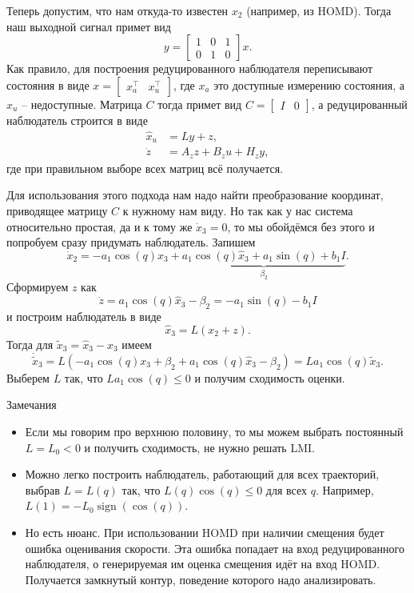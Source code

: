 \documentclass{article}
\newcommand{\sign}{\operatorname{sign}}
\begin{document}
Теперь допустим, что нам откуда-то известен $x_2$ (например, из HOMD). Тогда наш выходной сигнал примет вид
\[
	y = \begin{bmatrix} 1 & 0 & 1 \\ 0 & 1 & 0 \end{bmatrix}x.
\]
Как правило, для построения редуцированного наблюдателя переписывают состояния в виде $x=\begin{bmatrix} x_a^\top & x_u^\top \end{bmatrix}$, где $x_a$ это доступные измерению состояния, а $x_u$ -- недоступные. Матрица $C$ тогда примет вид $C=\begin{bmatrix} I & 0 \end{bmatrix}$, а редуцированный наблюдатель строится в виде
\[
	\begin{aligned}
		\hat{x}_u &= Ly + z, \\
		\dot{z} &= A_z z + B_z u + H_z y,
	\end{aligned}
\]
где при правильном выборе всех матриц всё получается. 

Для использования этого подхода нам надо найти преобразование координат, приводящее матрицу $C$ к нужному нам виду. Но так как у нас система относительно простая, да и к тому же $\dot{x}_3=0$, то мы обойдёмся без этого и попробуем сразу придумать наблюдатель. Запишем
\[
	\dot{x}_2 = -a_1\cos(q)x_3 + \underbrace{a_1\cos(q)\hat{x}_3 + a_1\sin(q) + b_1I}_{\beta_2}.
\]
Сформируем $z$ как
\[
	\dot{z} = a_1\cos(q)\hat{x}_3 - \beta_2 = -a_1\sin(q) - b_1I
\]
и построим наблюдатель в виде
\[
	\hat{x}_3 = L \left(x_2 + z\right).
\]
Тогда для $\tilde{x}_3 = \hat{x}_3 - x_3$ имеем
\[
	\dot{\tilde{x}}_3 = L \left(-a_1\cos(q)x_3 + \beta_2 +  a_1\cos(q)\hat{x}_3 - \beta_2\right) = La_1\cos(q)\tilde{x}_3.
\]
Выберем $L$ так, что $La_1\cos(q)\le0$ и получим сходимость оценки.

Замечания
\begin{itemize}
\item Если мы говорим про верхнюю половину, то мы можем выбрать постоянный $L=L_0<0$ и получить сходимость, не нужно решать LMI.
\item Можно легко построить наблюдатель, работающий для всех траекторий, выбрав $L=L(q)$ так, что $L(q)\cos(q)\le 0$ для всех $q$. Например, $L(1)= -L_0 \sign(\cos(q))$.
\item Но есть нюанс. При использовании HOMD при наличии смещения будет ошибка оценивания скорости. Эта ошибка попадает на вход редуцированного наблюдателя, о генерируемая им оценка смещения идёт на вход HOMD. Получается замкнутый контур, поведение которого надо анализировать.
\end{itemize}
\end{document}

